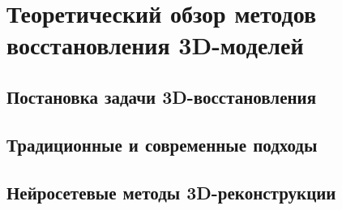 \chapter{Теоретический обзор методов восстановления 3D-моделей}

\section{Постановка задачи 3D-восстановления}
\section{Традиционные и современные подходы}
\section{Нейросетевые методы 3D-реконструкции}

